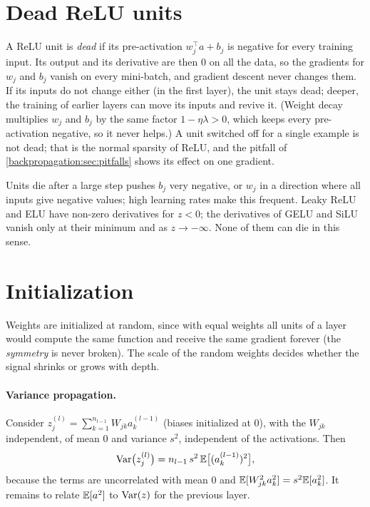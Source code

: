 \begin{notechapter}
\section{Dead ReLU units}\label{activation-functions:sec:dead}

A ReLU unit is \emph{dead} if its pre-activation $w_j^\top a + b_j$ is negative for every training input. Its
output and its derivative are then $0$ on all the data, so the gradients for $w_j$ and $b_j$ vanish
on every mini-batch, and gradient descent never changes them. If its inputs do not change either
(in the first layer), the unit stays dead; deeper, the training of earlier layers can move its
inputs and revive it. (Weight decay multiplies $w_j$ and $b_j$ by the same factor $1 - \eta\lambda>0$,
which keeps every pre-activation negative, so it never helps.) A unit
switched off for a single example is not dead; that is the normal sparsity of ReLU, and
the pitfall of \cref{backpropagation:sec:pitfalls} shows its effect on one gradient.

Units die after a large step pushes $b_j$ very negative, or $w_j$ in a direction where all inputs
give negative values; high learning rates make this frequent. Leaky ReLU and ELU
have non-zero derivatives for $z<0$; the derivatives of GELU and SiLU vanish only at their minimum
and as $z\to-\infty$. None of them can die in this sense.

\section{Initialization}\label{activation-functions:sec:init}

Weights are initialized at random, since with equal weights all units of a layer would
compute the same function and receive the same gradient forever (the \emph{symmetry} is
never broken). The scale of the random weights decides whether the signal shrinks or grows
with depth.

\paragraph{Variance propagation.} Consider $z^{(l)}_j = \sum_{k=1}^{n_{l-1}}W_{jk}a^{(l-1)}_k$ (biases initialized at $0$), with
the $W_{jk}$ independent, of mean $0$ and variance $s^2$, independent of the activations. Then
\[
  \operatorname{Var}\bigl(z^{(l)}_j\bigr) = n_{l-1}\,s^2\,\mathbb{E}\bigl[(a^{(l-1)}_k)^2\bigr],
\]
because the terms are uncorrelated with mean $0$ and $\mathbb{E}[W_{jk}^2a_k^2] = s^2\mathbb{E}[a_k^2]$. It remains to relate
$\mathbb{E}[a^2]$ to $\operatorname{Var}(z)$ for the previous layer.


\end{notechapter}
